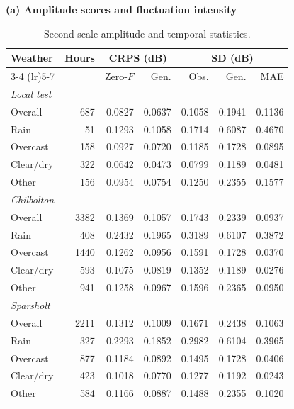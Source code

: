 \begin{table}[t]
\centering
\caption{Second-scale amplitude and temporal statistics.}
\label{tab:fast_amplitude_temporal}
\footnotesize
\setlength{\tabcolsep}{2pt}
\renewcommand{\arraystretch}{1.06}

\textbf{(a) Amplitude scores and fluctuation intensity}
\par\smallskip

\begin{tabular*}{\columnwidth}
{@{\extracolsep{\fill}}lrrrrrr@{}}
\toprule
Weather & Hours
& \multicolumn{2}{c}{CRPS (dB)}
& \multicolumn{3}{c}{SD (dB)} \\
\cmidrule(lr){3-4}
\cmidrule(lr){5-7}
& & Zero-$F$ & Gen. & Obs. & Gen. & MAE \\
\midrule

\multicolumn{7}{l}{\textit{Local test}} \\
Overall   & 687 & 0.0827 & 0.0637 & 0.1058 & 0.1941 & 0.1136 \\
Rain      & 51  & 0.1293 & 0.1058 & 0.1714 & 0.6087 & 0.4670 \\
Overcast  & 158 & 0.0927 & 0.0720 & 0.1185 & 0.1728 & 0.0895 \\
Clear/dry & 322 & 0.0642 & 0.0473 & 0.0799 & 0.1189 & 0.0481 \\
Other     & 156 & 0.0954 & 0.0754 & 0.1250 & 0.2355 & 0.1577 \\

\multicolumn{7}{l}{\textit{Chilbolton}} \\
Overall   & 3382 & 0.1369 & 0.1057 & 0.1743 & 0.2339 & 0.0937 \\
Rain      & 408  & 0.2432 & 0.1965 & 0.3189 & 0.6107 & 0.3872 \\
Overcast  & 1440 & 0.1262 & 0.0956 & 0.1591 & 0.1728 & 0.0370 \\
Clear/dry & 593  & 0.1075 & 0.0819 & 0.1352 & 0.1189 & 0.0276 \\
Other     & 941  & 0.1258 & 0.0967 & 0.1596 & 0.2365 & 0.0950 \\

\multicolumn{7}{l}{\textit{Sparsholt}} \\
Overall   & 2211 & 0.1312 & 0.1009 & 0.1671 & 0.2438 & 0.1063 \\
Rain      & 327  & 0.2293 & 0.1852 & 0.2982 & 0.6104 & 0.3965 \\
Overcast  & 877  & 0.1184 & 0.0892 & 0.1495 & 0.1728 & 0.0406 \\
Clear/dry & 423  & 0.1018 & 0.0770 & 0.1277 & 0.1192 & 0.0243 \\
Other     & 584  & 0.1166 & 0.0887 & 0.1488 & 0.2355 & 0.1020 \\


\end{tabular*}
\end{table}
